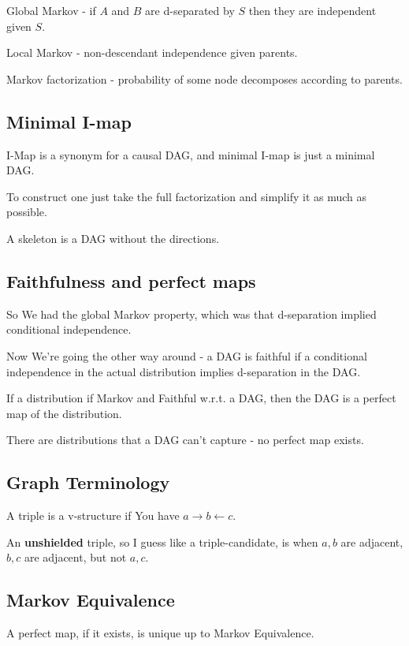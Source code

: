 \documentclass{article}
\begin{document}
		Global Markov - if $A$ and $B$ are d-separated by $S$ then they are independent given $S$.
		
		Local Markov - non-descendant independence given parents.
		
		Markov factorization - probability of some node decomposes according to parents.
		
	\subsection{Minimal I-map}
	
		I-Map is a synonym for a causal DAG, and minimal I-map is just a minimal DAG.
		
		To construct one just take the full factorization and simplify it as much as possible.
		
		A skeleton is a DAG without the directions.
		
	\subsection{Faithfulness and perfect maps}
	
		So We had the global Markov property, which was that d-separation implied conditional independence.
		
		Now We're going the other way around - a DAG is faithful if a conditional independence in the actual distribution implies d-separation in the DAG.
		
		If a distribution if Markov and Faithful w.r.t. a DAG, then the DAG is a perfect map of the distribution.
		
		There are distributions that a DAG can't capture - no perfect map exists.
		
	\subsection{Graph Terminology}
	
		A triple is a v-structure if You have $a\to b \leftarrow c$.
		
		An \textbf{unshielded} triple, so I guess like a triple-candidate, is when $a, b$ are adjacent, $b, c$ are adjacent, but not $a, c$.
		
	\subsection{Markov Equivalence}
	
		A perfect map, if it exists, is unique up to Markov Equivalence.
		
\end{document}
